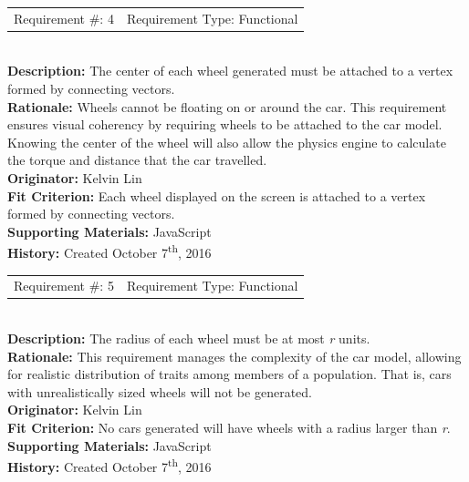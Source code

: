 \documentclass[12pt, titlepage]{article}
\begin{document}
\begin{reqbox}
%
\begin{tabular}{cc}
Requirement \#: 4 & Requirement Type: Functional \\
\end{tabular} \\
%
\textbf{Description:} The center of each wheel generated must be attached to a 
vertex formed by connecting vectors. \\
\textbf{Rationale:}  Wheels cannot be floating on or around the car. This 
requirement ensures visual coherency by requiring wheels to be attached to the 
car model. Knowing the center of the wheel will also allow the physics engine to 
calculate the torque and distance that the car travelled.\\
\textbf{Originator:} Kelvin Lin\\
\textbf{Fit Criterion:} Each wheel displayed on the screen is attached to a 
vertex formed by connecting vectors.\\
%  
\textbf{Supporting Materials:} JavaScript \\
\textbf{History:} Created October 7\textsuperscript{th}, 2016
%
\end{reqbox}

\newpage

\begin{reqbox}
%
\begin{tabular}{cc}
Requirement \#: 5 & Requirement Type: Functional \\
\end{tabular} \\
%
\textbf{Description:} The radius of each wheel must be at most \textit{r} units. 
\\
\textbf{Rationale:}  This requirement manages the complexity of the car model, 
allowing for realistic distribution of traits among members of a population. 
That is, cars with unrealistically sized wheels will not be generated.\\
\textbf{Originator:} Kelvin Lin\\
\textbf{Fit Criterion:} No cars generated will have wheels with a radius larger 
than \textit{r}.\\
%  
\textbf{Supporting Materials:} JavaScript \\
\textbf{History:} Created October 7\textsuperscript{th}, 2016
%
\end{reqbox}
\end{document}

